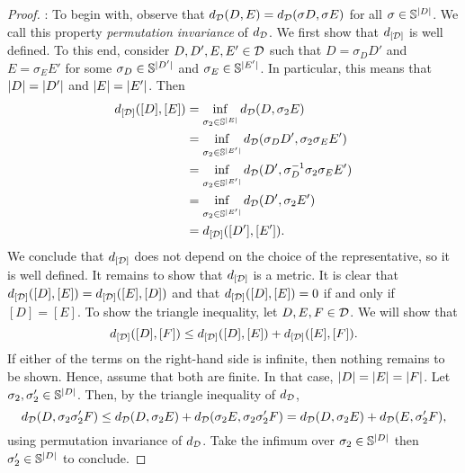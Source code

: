 \documentclass[12pt, twoside]{report}
\begin{document}
\begin{proof}
    :
    To begin with, observe that $d_{\mathcal{D}}(D, E) = d_{\mathcal{D}}(\sigma D, \sigma E)$ for all $\sigma \in \mathbb{S}^{\lvert D\rvert}$.
    We call this property \emph{permutation invariance} of $d_{\mathcal{D}}$.
    We first show that $d_{[\mathcal{D}]}$ is well defined.
    To this end, consider $D, D', E, E' \in \mathcal{D}$ such that $D = \sigma_D D'$ and $E = \sigma_E E'$ for some $\sigma_D \in \mathbb{S}^{\lvert D'\rvert}$ and $\sigma_E \in \mathbb{S}^{\lvert E'\rvert}$.
    In particular, this means that $\lvert D\rvert = \lvert D'\rvert$ and $\lvert E\rvert = \lvert E'\rvert$.
    Then
    \begin{align}
        d_{[\D]}([D], [E])
        &= \inf_{\sigma_2 \in \Sb^{\abs{E}}} d_\D(D, \sigma_2 E) \\
        &= \inf_{\sigma_2 \in \Sb^{\abs{E'}}} d_\D(\sigma_D D', \sigma_2 \sigma_E E') \\
        &= \inf_{\sigma_2 \in \Sb^{\abs{E'}}} d_\D(D', \sigma_D^{-1} \sigma_2 \sigma_E E') \\
        &= \inf_{\sigma_2 \in \Sb^{\abs{E'}}} d_\D(D', \sigma_2 E') \\
        &= d_{[\D]}([D'], [E']).
    \end{align}
    We conclude that $d_{[\mathcal{D}]}$ does not depend on the choice of the representative, so it is well defined.
    It remains to show that $d_{[\mathcal{D}]}$ is a metric.
    It is clear that $d_{[\mathcal{D}]}([D], [E]) = d_{[\mathcal{D}]}([E], [D])$ and that $d_{[\mathcal{D}]}([D], [E]) = 0$ if and only if $[D] = [E]$.
    To show the triangle inequality,
    let $D, E, F \in \mathcal{D}$.
    We will show that
    \begin{equation}
        d_{[\mathcal{D}]}([D], [F])
        \le
        d_{[\mathcal{D}]}([D], [E])
        + d_{[\mathcal{D}]}([E], [F]).
    \end{equation}
    If either of the terms on the right-hand side is infinite, then nothing remains to be shown.
    Hence, assume that both are finite.
    In that case, $\lvert D\rvert = \lvert E\rvert = \lvert F\rvert$.
    Let $\sigma_2, \sigma'_2 \in \mathbb{S}^{\lvert D\rvert}$.
    Then, by the triangle inequality of $d_{\mathcal{D}}$,
    \begin{equation}
        d_{\mathcal{D}}(D, \sigma_2 \sigma_2' F) \le d_{\mathcal{D}}(D, \sigma_2 E) + d_{\mathcal{D}}(\sigma_2 E, \sigma_2 \sigma_2' F)
        = d_{\mathcal{D}}(D, \sigma_2 E) + d_{\mathcal{D}}(E, \sigma_2' F),
    \end{equation}
    using permutation invariance of $d_{\mathcal{D}}$.
    Take the infimum over $\sigma_2 \in \mathbb{S}^{\lvert D\rvert}$ then $\sigma_2' \in \mathbb{S}^{\lvert D\rvert}$ to conclude.


\end{proof}
\end{document}
